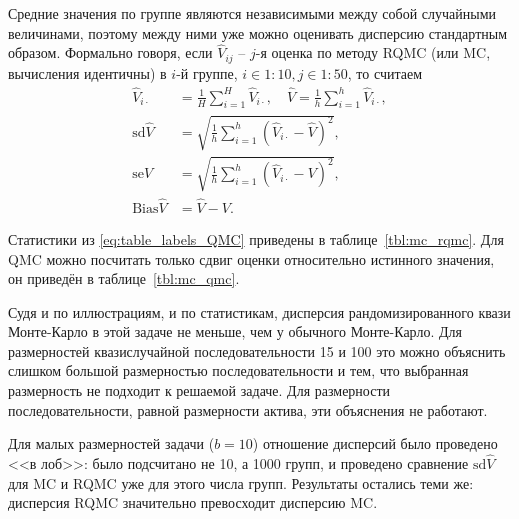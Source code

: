 \documentclass{article}
\newcommand{\Vhat}{\hat{V}}
\begin{document}
Средние значения по группе являются независимыми между собой случайными величинами, поэтому между ними уже можно оценивать дисперсию стандартным образом. Формально говоря, если $\Vhat_{ij}$ -- $j$-я оценка по методу RQMC (или MC, вычисления идентичны) в $i$-й группе, $i \in 1\mathbin{:} 10, j \in 1\mathbin{:} 50$, то считаем
\begin{equation}\label{eq:table_labels_QMC}
\begin{aligned}
	\Vhat_{i\cdot} &= \frac{1}{H}\sum_{i=1}^H \Vhat_{i\cdot}, \quad
	\Vhat = \frac{1}{h}\sum_{i=1}^h \Vhat_{i\cdot}, \\
	\mathrm{sd}\Vhat &= \sqrt{\frac{1}{h}\sum_{i=1}^h \left(\Vhat_{i\cdot} - \Vhat\right)^2}, \\
	\mathrm{se}\Vhat &= \sqrt{\frac{1}{h}\sum_{i=1}^h \left(\Vhat_{i\cdot} - V\right)^2}, \\
	\mathrm{Bias}\Vhat &= \Vhat - V.
\end{aligned}
\end{equation}

Статистики из \eqref{eq:table_labels_QMC} приведены в таблице~\ref{tbl:mc_rqmc}. Для QMC можно посчитать только сдвиг оценки относительно истинного значения, он приведён в таблице~\ref{tbl:mc_qmc}.

Судя и по иллюстрациям, и по статистикам, дисперсия рандомизированного квази Монте-Карло в этой задаче не меньше, чем у обычного Монте-Карло. Для размерностей квазислучайной последовательности 15 и 100 это можно объяснить слишком большой размерностью последовательности и тем, что выбранная размерность не подходит к решаемой задаче. Для размерности последовательности, равной размерности актива, эти объяснения не работают.

Для малых размерностей задачи ($b = 10$) отношение дисперсий было проведено <<в лоб>>: было подсчитано не 10, а 1000 групп, и проведено сравнение $\mathrm{sd}\Vhat$ для MC и RQMC уже для этого числа групп. Результаты остались теми же: дисперсия RQMC значительно превосходит дисперсию MC.
\end{document}
